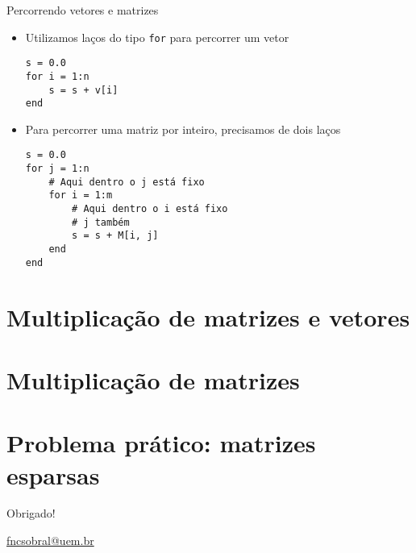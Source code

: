 \documentclass[]{beamer}
\newcommand{\code}[1]{\colorbox[gray]{0.8}{\texttt{#1}}}
\begin{document}
\begin{frame}[fragile]{Percorrendo vetores e matrizes}
  
  \begin{itemize}
  \item Utilizamos laços do tipo \code{for} para percorrer um vetor

    \begin{center}
      \begin{minipage}[c]{0.5\linewidth}
\begin{verbatim}
s = 0.0
for i = 1:n
    s = s + v[i]
end
\end{verbatim}
      \end{minipage}
    \end{center}
    
  \item Para percorrer uma matriz por inteiro, precisamos de
    \alert{dois laços}

    \begin{center}
      \begin{minipage}[c]{0.5\linewidth}
\begin{verbatim}
s = 0.0
for j = 1:n
    # Aqui dentro o j está fixo
    for i = 1:m
        # Aqui dentro o i está fixo
        # j também
        s = s + M[i, j]
    end
end
\end{verbatim}
      \end{minipage}
    \end{center}

  \end{itemize}

\end{frame}


\section{Multiplicação de matrizes e vetores}

\section{Multiplicação de matrizes}

\section{Problema prático: matrizes esparsas}

\begin{frame}
  \vfill
  \vfill
  \vfill
  \begin{center}
    \Huge Obrigado!
  \end{center}
  \vfill
  \vfill
  \begin{center} \url{fncsobral@uem.br} \end{center}
\end{frame}
\end{document}
